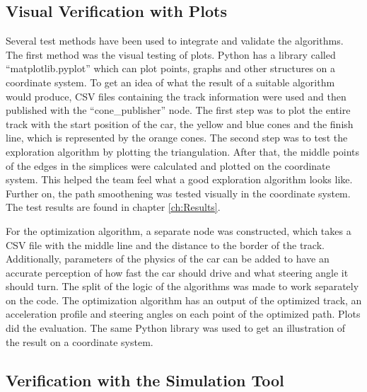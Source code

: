 \subsection{Visual Verification with Plots} \label{sec:Visual Verification with Plots}
Several test methods have been used to integrate and validate the algorithms. The first method was the visual testing of plots. Python has a library called ``matplotlib.pyplot'' which can plot points, graphs and other structures on a coordinate system. To get an idea of what the result of a suitable algorithm would produce, CSV files containing the track information were used and then published with the ``cone\_publisher'' node. The first step was to plot the entire track with the start position of the car, the yellow and blue cones and the finish line, which is represented by the orange cones. The second step was to test the exploration algorithm by plotting the triangulation. After that, the middle points of the edges in the simplices were calculated and plotted on the coordinate system. This helped the team feel what a good exploration algorithm looks like. Further on, the path smoothening was tested visually in the coordinate system. The test results are found in chapter \ref{ch:Results}.

For the optimization algorithm, a separate node was constructed, which takes a CSV file with the middle line and the distance to the border of the track. Additionally, parameters of the physics of the car can be added to have an accurate perception of how fast the car should drive and what steering angle it should turn. The split of the logic of the algorithms was made to work separately on the code. The optimization algorithm has an output of the optimized track, an acceleration profile and steering angles on each point of the optimized path. Plots did the evaluation. The same Python library was used to get an illustration of the result on a coordinate system.

\subsection{Verification with the Simulation Tool} \label{sec:Verification with the Simulation Tool}


